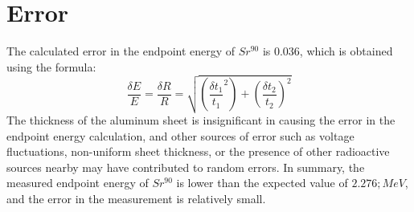 \section{Error}

	The calculated error in the endpoint energy of $Sr^{90}$ is 0.036, which is obtained using the formula: $$\frac{\delta E}{E}=\frac{\delta R}{R}=\sqrt{(\frac{\delta t_1}{t_1}^2)+(\frac{\delta t_2}{t_2})^2}$$ The thickness of the aluminum sheet is insignificant in causing the error in the endpoint energy calculation, and other sources of error such as voltage fluctuations, non-uniform sheet thickness, or the presence of other radioactive sources nearby may have contributed to random errors. In summary, the measured endpoint energy of $Sr^{90}$ is lower than the expected value of $2.276;MeV$, and the error in the measurement is relatively small.